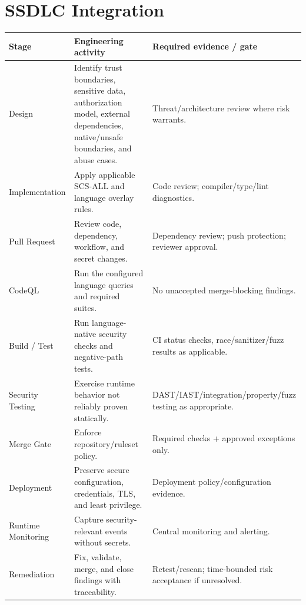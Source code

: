 \documentclass[10pt,letterpaper]{article}
\begin{document}
\section{SSDLC Integration}
\small
\begin{tabularx}{\textwidth}{@{}P{1.12in}Y P{2.15in}@{}}
\toprule
\textbf{Stage} & \textbf{Engineering activity} & \textbf{Required evidence / gate}\\
\midrule
Design & Identify trust boundaries, sensitive data, authorization model, external dependencies, native/\allowbreak unsafe boundaries, and abuse cases. & Threat/\allowbreak architecture review where risk warrants.\\
Implementation & Apply applicable SCS-ALL and language overlay rules. & Code review; compiler/\allowbreak type/\allowbreak lint diagnostics.\\
Pull Request & Review code, dependency, workflow, and secret changes. & Dependency review; push protection; reviewer approval.\\
CodeQL & Run the configured language queries and required suites. & No unaccepted merge-blocking findings.\\
Build / Test & Run language-native security checks and negative-path tests. & CI status checks, race/\allowbreak sanitizer/\allowbreak fuzz results as applicable.\\
Security Testing & Exercise runtime behavior not reliably proven statically. & DAST/\allowbreak IAST/\allowbreak integration/\allowbreak property/\allowbreak fuzz testing as appropriate.\\
Merge Gate & Enforce repository/\allowbreak ruleset policy. & Required checks + approved exceptions only.\\
Deployment & Preserve secure configuration, credentials, TLS, and least privilege. & Deployment policy/\allowbreak configuration evidence.\\
Runtime Monitoring & Capture security-relevant events without secrets. & Central monitoring and alerting.\\
Remediation & Fix, validate, merge, and close findings with traceability. & Retest/\allowbreak rescan; time-bounded risk acceptance if unresolved.\\
\bottomrule
\end{tabularx}
\normalsize
\end{document}
